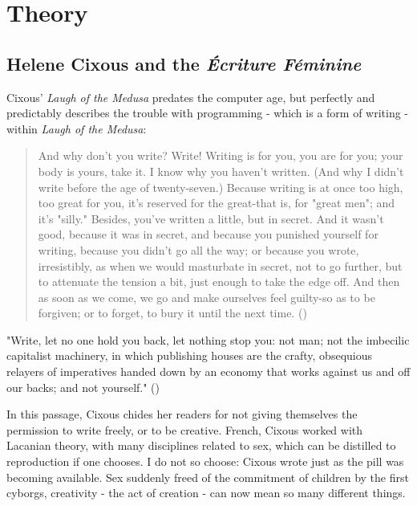
\section{Theory}

\subsection{Helene Cixous and the \textit{Écriture Féminine}}
Cixous' \textit{Laugh of the Medusa} predates the computer age, but perfectly and predictably describes the trouble with programming - which is a form of writing - within \textit{Laugh of the Medusa}: 

\begin{quote}
And why don't you write? Write! Writing is for you, you are for you; your body is yours, take it. I know why you haven't written. (And why I didn't write before the age of twenty-seven.) Because writing is at once too high, too great for you, it's reserved for the great-that is, for "great men"; and it's "silly." Besides, you've written a little, but in secret. And it wasn't good, because it was in secret, and because you punished yourself for writing, because you didn't go all the way; or because you wrote, irresistibly, as when we would masturbate in secret, not to go further, but to attenuate the tension a bit, just enough to take the edge off. And then as soon as we come, we go and make ourselves feel guilty-so as to be forgiven; or to forget, to bury it until the next time. 
(\cite[p.876-877]{cixous})
\end{quote}

"Write, let no one hold you back, let nothing stop you: not man; not the imbecilic capitalist machinery, in which publishing houses are the crafty, obsequious relayers of imperatives handed down by an economy that works against us and off our backs; and not yourself."
(\cite{cixous})

In this passage, Cixous chides her readers for not giving themselves the permission to write freely, or to be creative. French, Cixous worked with Lacanian theory, with many disciplines related to sex, which can be distilled to reproduction if one chooses. I do not so choose: Cixous wrote just as the pill was becoming available. Sex suddenly freed of the commitment of children by the first cyborgs, creativity - the act of creation - can now mean so many different things.

